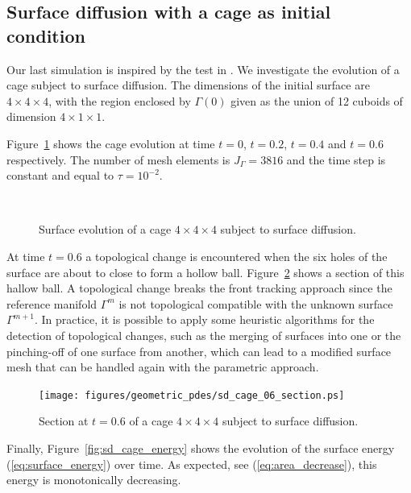 \subsection{Surface diffusion with a cage as initial condition}
\label{subsec:sd_cage}
Our last simulation is inspired by the test in \cite[Fig.~15]{gflows3d}. We
investigate the evolution of a cage subject to surface diffusion. The
dimensions of the initial surface are $4 \times 4 \times 4$, with the region
enclosed by $\Gamma(0)$ given as the union of 12 cuboids of dimension $4 \times
1 \times 1$.

Figure~\ref{fig:sd_cage} shows the cage evolution at time $t=0$, $t=0.2$,
$t=0.4$ and $t=0.6$ respectively. The number of mesh elements is
$J_\Gamma=3816$ and the time step is constant and equal to $\tau=10^{-2}$.

\begin{figure}[htbp]
\centering
{}
\\
\caption[Surface diffusion cage]{Surface evolution of a cage $4 \times 4 \times
4$ subject to surface diffusion.}
\label{fig:sd_cage}
\end{figure}

At time $t=0.6$ a topological change is encountered when the six holes of the
surface are about to close to form a hollow ball.
Figure~\ref{fig:sd_cage_section} shows a section of this hallow ball. A
topological change breaks the front tracking approach since the reference
manifold $\Gamma^m$ is not topological compatible with the unknown surface
$\Gamma^{m+1}$. In practice, it is possible to apply some heuristic algorithms
for the detection of topological changes, such as the merging of surfaces into
one or the pinching-off of one surface from another, which can lead to a
modified surface mesh that can be handled again with the parametric approach.

\begin{figure}[htbp]
\centering
\texttt{[image: figures/geometric\_pdes/sd\_cage\_06\_section.ps]}
\caption[Surface diffusion cage section]{Section at $t=0.6$ of a cage $4 \times
4 \times 4$ subject to surface diffusion.}
\label{fig:sd_cage_section}
\end{figure}

Finally, Figure~\ref{fig:sd_cage_energy} shows the evolution of the surface
energy (\ref{eq:surface_energy}) over time. As expected, see
(\ref{eq:area_decrease}), this energy is monotonically decreasing.

